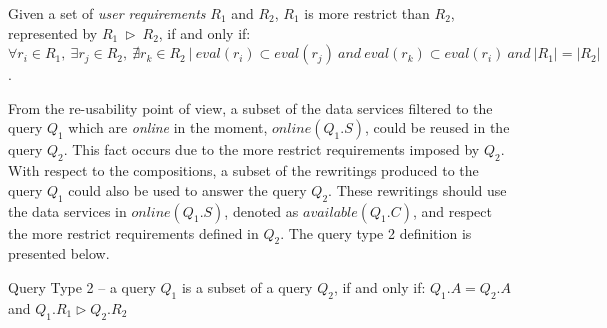 \begin{definition}\label{def:reqmore}
Given a set of \textsl{user requirements} $R_{1}$ and $R_{2}$, $R_{1}$ is more restrict than $R_{2}$, represented by $R_{1} \ \rhd \ R_{2}$, if and only if: $\forall r_{i} \in R_{1}, \ \exists r_{j} \in R_{2}, \ \nexists r_{k} \in R_{2} \ \vert \ eval (r_{i}) \subset eval(r_{j}) \ and \ eval (r_{k}) \subset eval(r_{i}) \ and \ \vert R_{1} \vert = \vert R_{2} \vert$.
\end{definition}

From the re-usability point of view, a subset of the data services filtered to the query $Q_{1}$ which are \textit{online} in the moment, $online(Q_{1}.S)$, could be reused in the query $Q_{2}$. This fact occurs due to the more restrict requirements imposed by $Q_{2}$.
With respect to the compositions, a subset of the rewritings produced to the query $Q_{1}$ could also be used to answer the query $Q_{2}$. These rewritings should use the data services in $online(Q_{1}.S)$, denoted as $available(Q_{1}.C)$, and respect the more restrict requirements defined in $Q_{2}$. 
The query type 2 definition is presented below.

\begin{definition}\label{def:qt2}
Query Type 2 -- a query $Q_{1}$ is a subset of a query $Q_{2}$, if and only if: $Q_{1}.A = Q_{2}.A$ and $Q_{1}.R_{1} \rhd Q_{2}.R_{2}$
\end{definition}
